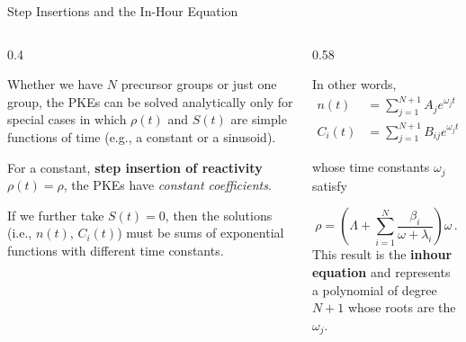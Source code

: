 \documentclass[aspectratio=1610]{beamer}
\begin{document}
\begin{frame}[fragile]{Step Insertions and the In-Hour Equation}


\begin{columns}[T]

\begin{column}{0.4\textwidth}

 

Whether we have $N$ precursor groups or just one group, the PKEs can be solved
analytically only for special cases in which $\rho(t)$ and $S(t)$ are simple functions of
time (e.g., a constant or a sinusoid).  

\vspace{0.35cm}

For a constant, {\bf step insertion of reactivity} $\rho(t) = \rho$, the PKEs have {\it constant coefficients}.

\vspace{0.35cm}

If we further take $S(t) = 0$, then the solutions (i.e., $n(t)$, $C_i(t)$) must be sums of exponential functions 
with different time constants.
\end{column}

\begin{column}{0.58\textwidth}
 
In other words,
\begin{align*}
   n(t)   &= \sum_{j=1}^{N+1} A_j e^{\omega_j t} \\
   C_i(t) &= \sum_{j=1}^{N+1} B_{ij} e^{\omega_j t} \, ,  \,i = 1, \ldots, N \, ,
\end{align*}

\vspace{-0.25cm}

whose time constants $\omega_j$ satisfy

\vspace{-0.25cm}

\begin{equation*}
\tag{FNRP 5.53}
   \boxed{\rho = \left ( \Lambda + \sum_{i=1}^N \frac{\beta_i}{\omega + \lambda_i} \right ) \omega} \, .
\end{equation*}
This result is the {\bf inhour equation} and represents a polynomial of degree $N+1$ whose 
roots are the $\omega_j$.
 
\end{column}

\end{columns}

\end{frame}
\end{document}
